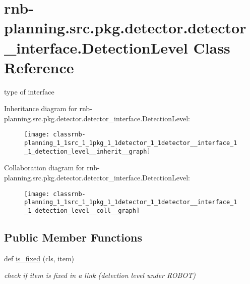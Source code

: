 \hypertarget{classrnb-planning_1_1src_1_1pkg_1_1detector_1_1detector__interface_1_1_detection_level}{}\section{rnb-\/planning.src.\+pkg.\+detector.\+detector\+\_\+interface.\+Detection\+Level Class Reference}
\label{classrnb-planning_1_1src_1_1pkg_1_1detector_1_1detector__interface_1_1_detection_level}


type of interface  




Inheritance diagram for rnb-\/planning.src.\+pkg.\+detector.\+detector\+\_\+interface.\+Detection\+Level\+:\nopagebreak
\begin{figure}[H]
\begin{center}
\leavevmode
\texttt{[image: classrnb-planning\_1\_1src\_1\_1pkg\_1\_1detector\_1\_1detector\_\_interface\_1\_1\_detection\_level\_\_inherit\_\_graph]}
\end{center}
\end{figure}


Collaboration diagram for rnb-\/planning.src.\+pkg.\+detector.\+detector\+\_\+interface.\+Detection\+Level\+:\nopagebreak
\begin{figure}[H]
\begin{center}
\leavevmode
\texttt{[image: classrnb-planning\_1\_1src\_1\_1pkg\_1\_1detector\_1\_1detector\_\_interface\_1\_1\_detection\_level\_\_coll\_\_graph]}
\end{center}
\end{figure}
\subsection*{Public Member Functions}
\begin{DoxyCompactItemize}
\item 
\mbox{\label{classrnb-planning_1_1src_1_1pkg_1_1detector_1_1detector__interface_1_1_detection_level_af01832d548cf07b00e9609f33731890a}} 
def \hyperlink{classrnb-planning_1_1src_1_1pkg_1_1detector_1_1detector__interface_1_1_detection_level_af01832d548cf07b00e9609f33731890a}{is\+\_\+fixed} (cls, item)
\begin{DoxyCompactList}\small\item\em check if item is fixed in a link (detection level under R\+O\+B\+OT) \end{DoxyCompactList}\end{DoxyCompactItemize}
